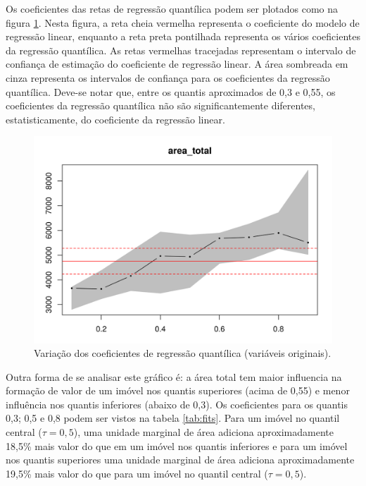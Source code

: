 \documentclass[a4paper, 12pt]{article}
\begin{document}
Os coeficientes das retas de regressão quantílica podem ser plotados
como na figura \ref{fig:coef1}. Nesta figura, a reta cheia vermelha
representa o coeficiente do modelo de regressão linear, enquanto a reta
preta pontilhada representa os vários coeficientes da regressão
quantílica. As retas vermelhas tracejadas representam o intervalo de
confiança de estimação do coeficiente de regressão linear. A área
sombreada em cinza representa os intervalos de confiança para os
coeficientes da regressão quantílica. Deve-se notar que, entre os
quantis aproximados de 0,3 e 0,55, os coeficientes da regressão
quantílica não são significantemente diferentes, estatisticamente, do
coeficiente da regressão linear.

\begin{figure}[H]

{\centering \includegraphics[width=0.7\linewidth]{images/coef1-1} 

}

\caption{Variação dos coeficientes de regressão quantílica (variáveis originais).}\label{fig:coef1}
\end{figure}

Outra forma de se analisar este gráfico é: a área total tem maior
influencia na formação de valor de um imóvel nos quantis superiores
(acima de 0,55) e menor influência nos quantis inferiores (abaixo de
0,3). Os coeficientes para os quantis 0,3; 0,5 e 0,8 podem ser vistos na
tabela \ref{tab:fits}. Para um imóvel no quantil central
(\(\tau = 0,5\)), uma unidade marginal de área adiciona aproximadamente
18,5\% mais valor do que em um imóvel nos quantis inferiores e para um
imóvel nos quantis superiores uma unidade marginal de área adiciona
aproximadamente 19,5\% mais valor do que para um imóvel no quantil
central (\(\tau = 0,5\)).
\end{document}
